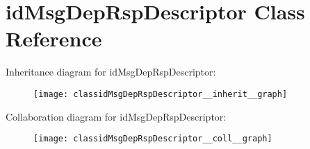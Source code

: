 \hypertarget{classidMsgDepRspDescriptor}{}\section{id\+Msg\+Dep\+Rsp\+Descriptor Class Reference}
\label{classidMsgDepRspDescriptor}


Inheritance diagram for id\+Msg\+Dep\+Rsp\+Descriptor\+:\nopagebreak
\begin{figure}[H]
\begin{center}
\leavevmode
\texttt{[image: classidMsgDepRspDescriptor\_\_inherit\_\_graph]}
\end{center}
\end{figure}


Collaboration diagram for id\+Msg\+Dep\+Rsp\+Descriptor\+:\nopagebreak
\begin{figure}[H]
\begin{center}
\leavevmode
\texttt{[image: classidMsgDepRspDescriptor\_\_coll\_\_graph]}
\end{center}
\end{figure}
